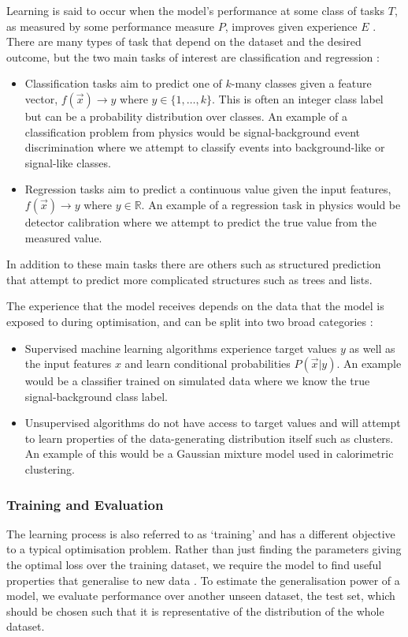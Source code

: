 Learning is said to occur when the model's performance at some class of tasks $T$, as measured by some performance measure $P$, improves given experience $E$ \cite{Learning}.
There are many types of task that depend on the dataset and the desired outcome, but the two main tasks of interest are classification and regression \cite{DeepLearningBook}:
\begin{itemize}[noitemsep]
    \item Classification tasks aim to predict one of $k$-many classes given a feature vector, $f(\vec{x})\rightarrow{}y$ where $y\in\{1,\dots,k\}$.
This is often an integer class label but can be a probability distribution over classes. An example of a classification problem from physics would be signal-background event discrimination where we attempt to classify events into background-like or signal-like classes.
    \item Regression tasks aim to predict a continuous value given the input features, $f(\vec{x})\rightarrow{}y$ where $y\in\mathds{R}$. An example of a regression task in physics would be detector calibration where we attempt to predict the true value from the measured value. 
\end{itemize}
In addition to these main tasks there are others such as structured prediction that attempt to predict more complicated structures such as trees and lists.


The experience that the model receives depends on the data that the model is exposed to during optimisation, and can be split into two broad categories \cite{DeepLearningBook}:
\begin{itemize}[noitemsep]
    \item Supervised machine learning algorithms experience target values $y$ as well as the input features $x$ and learn conditional probabilities $P(\vec{x}|y)$.  
          An example would be a classifier trained on simulated data where we know the true signal-background class label. 
    \item Unsupervised algorithms do not have access to target values and will attempt to learn properties of the data-generating distribution itself such as clusters.
          An example of this would be a Gaussian mixture model used in calorimetric clustering.
\end{itemize}



\subsubsection{Training and Evaluation}
The learning process is also referred to as `training' and has a different objective to a typical optimisation problem. Rather than just finding the parameters giving the optimal loss over the training dataset, we require the model to find useful properties that generalise to new data \cite{DeepLearningBook}. 
To estimate the generalisation power of a model, we evaluate performance over another unseen dataset, the test set, which should be chosen such that it is representative of the distribution of the whole dataset.


